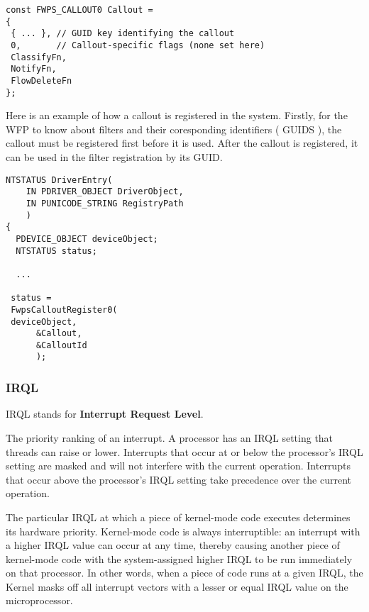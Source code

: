 \vspace{5mm}

\begin{lstlisting}
const FWPS_CALLOUT0 Callout =
{
 { ... }, // GUID key identifying the callout
 0,       // Callout-specific flags (none set here)
 ClassifyFn,
 NotifyFn,
 FlowDeleteFn
};
\end{lstlisting}

\vspace{5mm}

Here is an example of how a callout is registered in the system. Firstly, for the WFP to know about filters and their coresponding identifiers ( GUIDS ), the callout must be registered first 
before it is used. After the callout is registered, it can be used in the filter registration by its GUID.

\vspace{5mm}

\begin{lstlisting}
NTSTATUS DriverEntry(
    IN PDRIVER_OBJECT DriverObject,
    IN PUNICODE_STRING RegistryPath
    )
{
  PDEVICE_OBJECT deviceObject;
  NTSTATUS status;

  ...

 status =
 FwpsCalloutRegister0(
 deviceObject,
      &Callout,
      &CalloutId
      );
\end{lstlisting}

\vspace{5mm}

\subsubsection{IRQL}

\vspace{5mm}

IRQL stands for \textbf{Interrupt Request Level}.

\vspace{5mm}

The priority ranking of an interrupt. A processor has an IRQL setting that threads can raise or lower. Interrupts that occur at or below the processor's IRQL setting are masked and will 
not interfere with the current operation. Interrupts that occur above the processor's IRQL setting take precedence over the current operation.

\vspace{5mm}

The particular IRQL at which a piece of kernel-mode code executes determines its hardware priority. Kernel-mode code is always interruptible: an interrupt with a higher IRQL value can 
occur at any time, thereby causing another piece of kernel-mode code with the system-assigned higher IRQL to be run immediately on that processor. In other words, when a piece of code 
runs at a given IRQL, the Kernel masks off all interrupt vectors with a lesser or equal IRQL value on the microprocessor.

